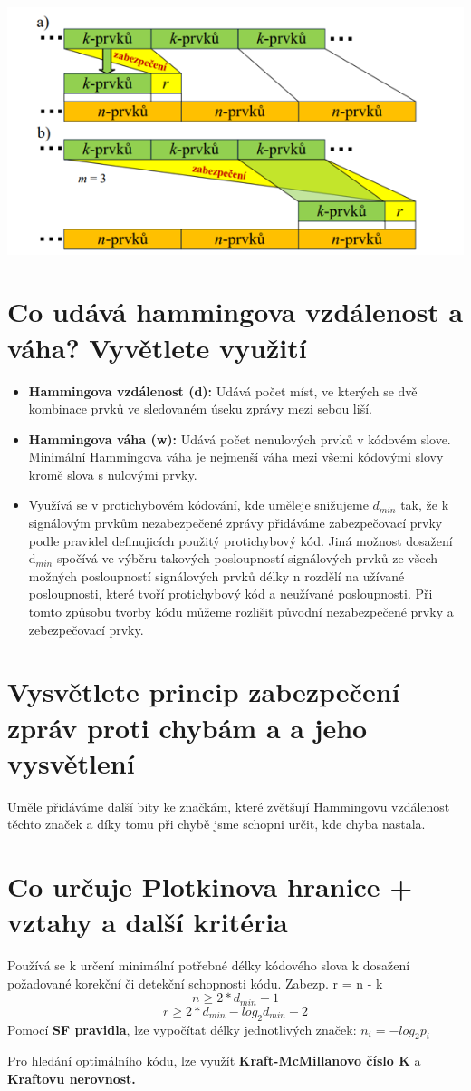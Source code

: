 \includegraphics[]{images/zabezpečování.png}

\section{Co udává hammingova vzdálenost a váha? Vyvětlete využití}

\begin{itemize}
    \item \textbf{Hammingova vzdálenost (d):} Udává počet míst, ve kterých se dvě kombinace prvků ve sledovaném úseku zprávy mezi sebou liší.
    

    
    \item \textbf{Hammingova váha (w):} Udává počet nenulových prvků v kódovém slove.
    Minimální Hammingova váha je nejmenší váha mezi všemi kódovými slovy kromě slova s nulovými prvky.
    
    \item Využívá se v protichybovém kódování, kde uměleje snižujeme $d_{min}$ tak, že k signálovým prvkům nezabezpečené zprávy přidáváme zabezpečovací prvky podle pravidel definujicích použitý protichybový kód.
    Jiná možnost dosažení d$_{min}$ spočívá ve výběru takových posloupností signálových prvků ze všech možných posloupností signálových prvků délky n rozdělí na užívané posloupnosti, které tvoří protichybový kód a neužívané posloupnosti.  Při tomto způsobu tvorby kódu můžeme rozlišit původní nezabezpečené prvky a zebezpečovací prvky.
\end{itemize}
\section{Vysvětlete princip zabezpečení zpráv proti chybám a a jeho vysvětlení}
Uměle přidáváme další bity ke značkám, které zvětšují Hammingovu vzdálenost těchto značek a díky tomu při chybě jsme schopni určit, kde chyba nastala.

\section{Co určuje Plotkinova hranice + vztahy a další kritéria}
Používá se k určení minimální potřebné délky kódového slova k dosažení požadované korekční či detekční schopnosti kódu. Zabezp. r = n - k
$$n \geq 2* d_{min} -1$$
$$r \geq 2* d_{min} -  log_{2}  d_{min} -2$$
Pomocí \textbf{SF pravidla}, lze vypočítat délky jednotlivých značek: $n_{i} = -log_{2}p_{i}$

Pro hledání optimálního kódu, lze využít \textbf{Kraft-McMillanovo číslo K} a \textbf{Kraftovu nerovnost.}

